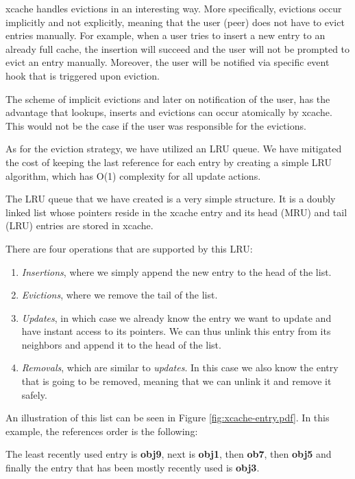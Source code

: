 xcache handles evictions in an interesting way. More specifically, evictions 
occur implicitly and not explicitly, meaning that the user (peer) does not have 
to evict entries manually. For example, when a user tries to insert a new entry 
to an already full cache, the insertion will succeed and the user will not be 
prompted to evict an entry manually. Moreover, the user will be notified via 
specific event hook that is triggered upon eviction.

The scheme of implicit evictions and later on notification of the user, has the 
advantage that lookups, inserts and evictions can occur atomically by xcache.  
This would not be the case if the user was responsible for the evictions.

As for the eviction strategy, we have utilized an LRU queue. We have mitigated 
the cost of keeping the last reference for each entry by creating a simple LRU 
algorithm, which has O(1) complexity for all update actions.

The LRU queue that we have created is a very simple structure. It is a doubly 
linked list whose pointers reside in the xcache entry and its head (MRU) and 
tail (LRU) entries are stored in xcache.

There are four operations that are supported by this LRU:

\begin{enumerate}
	\item \textit{Insertions}, where we simply append the new entry to the
		head of the list.
	\item \textit{Evictions}, where we remove the tail of the list.
	\item \textit{Updates}, in which case we already know the entry we want 
		to update and have instant access to its pointers.  We can thus 
		unlink this entry from its neighbors and append it to the head 
		of the list.
	\item \textit{Removals}, which are similar to \textit{updates}. In this 
		case we also know the entry that is going to be removed, 
		meaning that we can unlink it and remove it safely.
\end{enumerate}

An illustration of this list can be seen in Figure \ref{fig:xcache-entry.pdf}.  
In this example, the references order is the following:

The least recently used entry is \textbf{obj9}, next is \textbf{obj1}, then 
\textbf{ob7}, then \textbf{obj5} and finally the entry that has been mostly 
recently used is \textbf{obj3}.


